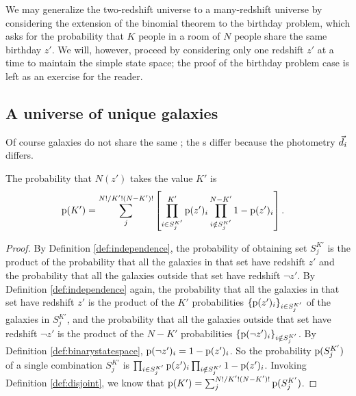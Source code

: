 We may generalize the two-redshift universe to a many-redshift universe by considering the extension of the binomial theorem to the birthday problem, which asks for the probability that $K$ people in a room of $N$ people share the same birthday $z'$.
We will, however, proceed by considering only one redshift $z'$ at a time to maintain the simple state space; the proof of the birthday problem case is left as an exercise for the reader.

\subsection{A universe of unique galaxies}

Of course galaxies do not share the same \pzpdf; the \pzpdf s differ because the photometry $\vec{d}_{i}$ differs.

\begin{lemma}\label{lem:unique}
	The probability that $N(z')$ takes the value $K'$ is 
	\begin{align}
	\eqlabel{eqn:general}
	\pr{K'} &= \sum_{j}^{N! / K'! (N - K')!} \left[ \prod_{i \in S^{K'}_{j}}^{K'} \pr{z'}_{i} \prod_{i \notin S^{K'}_{j}}^{N - K'} 1 - \pr{z'}_{i} \right] .
	\end{align}
\end{lemma}
\begin{proof}
	By Definition \ref{def:independence}, the probability of obtaining set $S^{K'}_{j}$ is the product of the probability that all the galaxies in that set have redshift $z'$ and the probability that all the galaxies outside that set have redshift $\lnot z'$.
	By Definition \ref{def:independence} again, the probability that all the galaxies in that set have redshift $z'$ is the product of the $K'$ probabilities $\{\mathrm{p}(z')_{i}\}_{i \in S^{K'}_{j}}$ of the galaxies in $S^{K'}_{j}$, and the probability that all the galaxies outside that set have redshift $\lnot z'$ is the product of the $N - K'$ probabilities $\{\mathrm{p}(\lnot z')_{i}\}_{i \notin S^{K'}_{j}}$.
	By Definition \ref{def:binarystatespace}, $\mathrm{p}(\lnot z')_{i} = 1 - \mathrm{p}(z')_{i}$.
	So the probability $\mathrm{p}(S^{K'}_{j})$ of a single combination $S^{K'}_{j}$ is $\prod_{i \in S^{K'}_{j}} \mathrm{p}(z')_{i} \prod_{i \notin S^{K'}_{j}} 1 - \mathrm{p}(z')_{i}$.
	Invoking Definition \ref{def:disjoint}, we know that $\mathrm{p}(K') = \sum_{j}^{N! / K'! (N - K')!} \mathrm{p}(S^{K'}_{j})$.
\end{proof}

